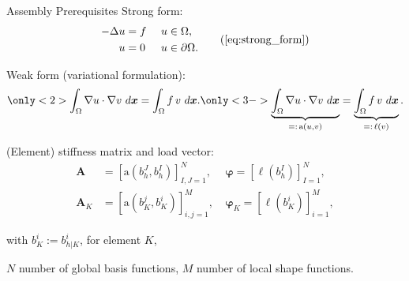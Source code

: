 \documentclass[xcolor=pdftex,table,10pt,yellow,mathserif]{beamer}
\renewcommand{\vec}[1]{\boldsymbol{#1}}
\newcommand{\mat}[1]{\mathbf{#1}}
\begin{document}
\begin{frame}{Assembly Prerequisites}
    Strong form:
    \begin{equation}
        \begin{aligned}
            -\Delta u & = f \  &  & u \in \Omega,         \\
            u         & = 0 \  &  & u \in \partial\Omega.
        \end{aligned}
        \tag{\ref{eq:strong_form}}
    \end{equation}
    \pause

    Weak form (variational formulation):
    \begin{equation}
        \begin{aligned}
            \only<2>{\int_\Omega \nabla u \cdot \nabla v \ d\vec{x}
                = \int_\Omega f \, v \ d\vec{x}.}
            \only<3->{\underbrace{\int_\Omega \nabla u \cdot \nabla v \ d\vec{x}}_{=: \, \mathrm{a}(u,v)}
                = \underbrace{\int_\Omega f \, v \ d\vec{x}}_{=: \, \ell(v)}.}
        \end{aligned}
    \end{equation}
    \pause
    \pause

    (Element) stiffness matrix and load vector:
    \begin{align}
        \mat{A}   & = \left[\mathrm{a}(b_h^J, b_h^I)\right]_{I,J=1}^N, \  & \vec{\varphi} = \left[\ell(b_h^I)\right]_{I=1}^N,   \\
        \mat{A}_K & = \left[\mathrm{a}(b_K^j, b_K^i)\right]_{i,j=1}^M, \  & \vec{\varphi}_K = \left[\ell(b_K^i)\right]_{i=1}^M,
    \end{align}

    \scriptsize

    with  $b_K^i := b_{h|K}^i$,
    for element $K$,

    $N$ number of global basis functions,
    $M$ number of local shape functions.
\end{frame}
\end{document}
